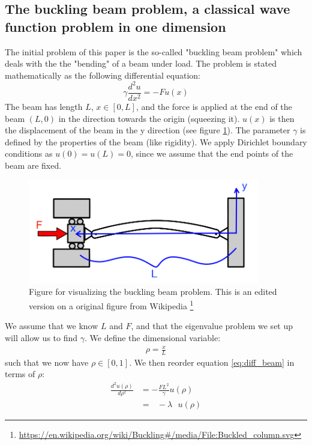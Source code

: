 \documentclass[american,a4paper,12pt]{article}
\begin{document}
\subsection{The buckling beam problem, a classical wave function problem in one dimension}
The initial problem of this paper is the so-called "buckling beam problem" which deals with the the "bending" of a beam under load. The problem is stated mathematically as the following differential equation:
\begin{equation}
    \gamma \frac{d^2u}{dx^2} = -Fu(x)
    \label{eq:diff_beam}
\end{equation}
The beam has length $L$, $x \in [0,L]$, and the force is applied at the end of the beam $(L,0)$ in the direction towards the origin (squeezing it). $u(x)$ is then the displacement of the beam in the y direction (see figure \ref{fig:buckling_beam}). The parameter $\gamma$ is defined by the properties of the beam (like rigidity). We apply Dirichlet boundary conditions as $u(0) = u(L) = 0$, since we assume that the end points of the beam are fixed.
\begin{figure}[H]
    \centering
    \includegraphics[width = 0.9\textwidth]{figures/buckling_beam.png}
    \caption{Figure for visualizing the buckling beam problem. This is an edited version on a original figure from Wikipedia \footnote{\url{https://en.wikipedia.org/wiki/Buckling#/media/File:Buckled_column.svg}}}
    \label{fig:buckling_beam}
\end{figure}
 We assume that we know $L$ and $F$, and that the eigenvalue problem we set up will allow us to find $\gamma$. We define the dimensional variable:
\begin{align*}
     \rho = \frac{x}{L}
\end{align*}
such that we now have $\rho \in [0,1]$. We then reorder equation \ref{eq:diff_beam} in terms of $\rho$:
\begin{align*}
     \frac{d^2u(\rho)}{d\rho^2} &= - \frac{FL^2}{\gamma}u(\rho) \\
     &= \ \ \ -\lambda \ \ \ u(\rho)
\end{align*}
\end{document}
